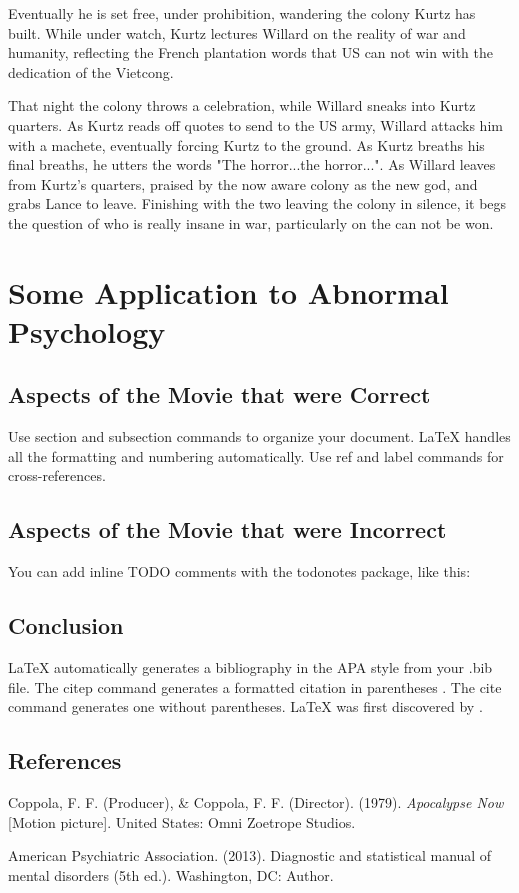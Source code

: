 \documentclass[a4paper,man,natbib]{apa6}
\begin{document}
Eventually he is set free, under prohibition, wandering the colony Kurtz has built. While under watch, Kurtz lectures Willard on the reality of war and humanity, reflecting the French plantation words that US can not win with the dedication of the Vietcong.

That night the colony throws a celebration, while Willard sneaks into Kurtz quarters. As Kurtz reads off quotes to send to the US army, Willard attacks him with a machete, eventually forcing Kurtz to the ground. As Kurtz breaths his final breaths, he utters the words "The horror...the horror...". As Willard leaves from Kurtz's quarters, praised by the now aware colony as the new god, and grabs Lance to leave. Finishing with the two leaving the colony  in silence, it begs the question of who is really insane in war, particularly on the can not be won.

\section{Some Application to Abnormal Psychology}
\label{sec:examples}

\subsection{Aspects of the Movie that were Correct}

Use section and subsection commands to organize your document. \LaTeX{} handles all the formatting and numbering automatically. Use ref and label commands for cross-references.

\subsection{Aspects of the Movie that were Incorrect}

You can add inline TODO comments with the todonotes package, like this:

\subsection{Conclusion}

LaTeX automatically generates a bibliography in the APA style from your .bib file. The citep command generates a formatted citation in parentheses \citep{Lamport1986}. The cite command generates one without parentheses. LaTeX was first discovered by \cite{Lamport1986}.

\pagebreak
\maketitle

\subsection{References}
Coppola, F. F. (Producer), \& Coppola, F. F. (Director). (1979). \textit{Apocalypse Now} [Motion picture]. United States: Omni Zoetrope Studios.

American Psychiatric Association. (2013). Diagnostic and statistical manual of mental disorders (5th ed.). Washington, DC: Author.
\end{document}
